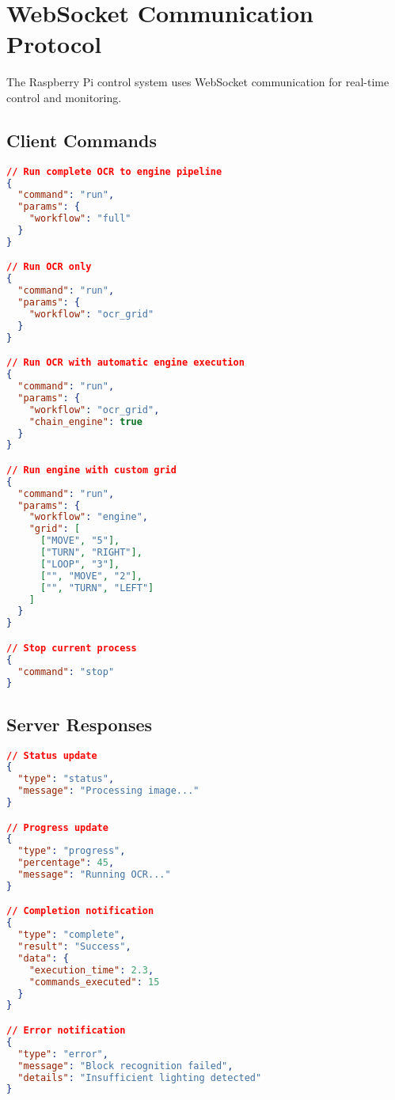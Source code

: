 \section{WebSocket Communication Protocol}

The Raspberry Pi control system uses WebSocket communication for real-time control and monitoring.

\subsection{Client Commands}

\begin{lstlisting}[language=json,caption=WebSocket Client Commands]
// Run complete OCR to engine pipeline
{
  "command": "run",
  "params": {
    "workflow": "full"
  }
}

// Run OCR only
{
  "command": "run",
  "params": {
    "workflow": "ocr_grid"
  }
}

// Run OCR with automatic engine execution
{
  "command": "run",
  "params": {
    "workflow": "ocr_grid",
    "chain_engine": true
  }
}

// Run engine with custom grid
{
  "command": "run",
  "params": {
    "workflow": "engine",
    "grid": [
      ["MOVE", "5"],
      ["TURN", "RIGHT"],
      ["LOOP", "3"],
      ["", "MOVE", "2"],
      ["", "TURN", "LEFT"]
    ]
  }
}

// Stop current process
{
  "command": "stop"
}
\end{lstlisting}

\subsection{Server Responses}

\begin{lstlisting}[language=json,caption=WebSocket Server Responses]
// Status update
{
  "type": "status",
  "message": "Processing image..."
}

// Progress update
{
  "type": "progress",
  "percentage": 45,
  "message": "Running OCR..."
}

// Completion notification
{
  "type": "complete",
  "result": "Success",
  "data": {
    "execution_time": 2.3,
    "commands_executed": 15
  }
}

// Error notification
{
  "type": "error",
  "message": "Block recognition failed",
  "details": "Insufficient lighting detected"
}
\end{lstlisting}

